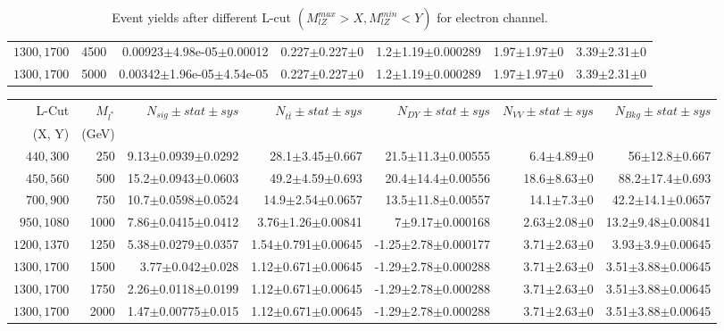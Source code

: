 \documentclass[]{article}
\begin{document}
\begin{table}
\begin{center}
{\begin{tabular}{ |r|r|r|r|r|r|r|}
$1300, 1700$ & 4500 & 0.00923$\pm$4.98e-05$\pm$0.00012 & 0.227$\pm$0.227$\pm$0 & 1.2$\pm$1.19$\pm$0.000289 & 1.97$\pm$1.97$\pm$0 & 3.39$\pm$2.31$\pm$0 \\
$1300, 1700$ & 5000 & 0.00342$\pm$1.96e-05$\pm$4.54e-05 & 0.227$\pm$0.227$\pm$0 & 1.2$\pm$1.19$\pm$0.000289 & 1.97$\pm$1.97$\pm$0 & 3.39$\pm$2.31$\pm$0 \\
\hline 
\end{tabular}
}
\end{center}
\caption{Event yields after different L-cut $(M_{lZ}^{max} > X, M_{lZ}^{min} < Y)$ for electron channel.}
\end{table}
\begin{table}
\begin{center}
\scriptsize{
\begin{tabular}{ |r|r|r|r|r|r|r|}
\hline 
L-Cut & $M_{l^*}$ & $N_{sig}\pm stat \pm sys $ &$N_{t\bar{t}}\pm stat \pm sys $ & $N_{DY}\pm stat \pm sys $ & $N_{VV}\pm stat \pm sys $ &$N_{Bkg}\pm stat \pm sys$\\
(X, Y) & (GeV) & && &&\\
\hline 
$440, 300$ & 250 & 9.13$\pm$0.0939$\pm$0.0292 & 28.1$\pm$3.45$\pm$0.667 & 21.5$\pm$11.3$\pm$0.00555 & 6.4$\pm$4.89$\pm$0 & 56$\pm$12.8$\pm$0.667 \\
$450, 560$ & 500 & 15.2$\pm$0.0943$\pm$0.0603 & 49.2$\pm$4.59$\pm$0.693 & 20.4$\pm$14.4$\pm$0.00556 & 18.6$\pm$8.63$\pm$0 & 88.2$\pm$17.4$\pm$0.693 \\
$700, 900$ & 750 & 10.7$\pm$0.0598$\pm$0.0524 & 14.9$\pm$2.54$\pm$0.0657 & 13.5$\pm$11.8$\pm$0.00557 & 14.1$\pm$7.3$\pm$0 & 42.2$\pm$14.1$\pm$0.0657 \\
$950, 1080$ & 1000 & 7.86$\pm$0.0415$\pm$0.0412 & 3.76$\pm$1.26$\pm$0.00841 & 7$\pm$9.17$\pm$0.000168 & 2.63$\pm$2.08$\pm$0 & 13.2$\pm$9.48$\pm$0.00841 \\
$1200, 1370$ & 1250 & 5.38$\pm$0.0279$\pm$0.0357 & 1.54$\pm$0.791$\pm$0.00645 & -1.25$\pm$2.78$\pm$0.000177 & 3.71$\pm$2.63$\pm$0 & 3.93$\pm$3.9$\pm$0.00645 \\
$1300, 1700$ & 1500 & 3.77$\pm$0.042$\pm$0.028 & 1.12$\pm$0.671$\pm$0.00645 & -1.29$\pm$2.78$\pm$0.000288 & 3.71$\pm$2.63$\pm$0 & 3.51$\pm$3.88$\pm$0.00645 \\
$1300, 1700$ & 1750 & 2.26$\pm$0.0118$\pm$0.0199 & 1.12$\pm$0.671$\pm$0.00645 & -1.29$\pm$2.78$\pm$0.000288 & 3.71$\pm$2.63$\pm$0 & 3.51$\pm$3.88$\pm$0.00645 \\
$1300, 1700$ & 2000 & 1.47$\pm$0.00775$\pm$0.015 & 1.12$\pm$0.671$\pm$0.00645 & -1.29$\pm$2.78$\pm$0.000288 & 3.71$\pm$2.63$\pm$0 & 3.51$\pm$3.88$\pm$0.00645 \\

\end{tabular}}
\end{center}
\end{table}
\end{document}
